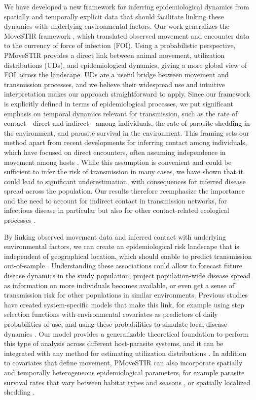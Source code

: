 \documentclass[letterpaper]{article}
\begin{document}
We have developed a new framework for inferring epidemiological dynamics from spatially and temporally explicit data that should facilitate linking these dynamics with underlying environmental factors. Our work generalizes the MoveSTIR framework \citep{Wilber2022}, which translated observed movement and encounter data to the currency of force of infection (FOI). Using a probabilistic perspective, PMoveSTIR provides a direct link between animal movement, utilization distributions (UDs), and epidemiological dynamics, giving a more global view of FOI across the landscape. UDs are a useful bridge between movement and transmission processes, and we believe their widespread use and intuitive interpretation makes our approach straightforward to apply.
Since our framework is explicitly defined in terms of epidemiological processes, we put significant emphasis on temporal dynamics relevant for transmission, such as the rate of contact---direct and indirect---among individuals, the rate of parasite shedding in the environment, and parasite survival in the environment. 
This framing sets our method apart from recent developments for inferring contact among individuals, which have focused on direct encounters, often assuming independence in movement among hosts \citep{Noonan2021,Das2023}. While this assumption is convenient and could be sufficient to infer the risk of transmission in many cases, we have shown that it could lead to significant underestimation, with consequences for inferred disease spread across the population. Our results therefore reemphasize the importance and the need to account for indirect contact in transmission networks, for infectious disease in particular but also for other contact-related ecological processes \citep{Wilber2022,Yang2023,Richardson2015}.

By linking observed movement data and inferred contact with underlying environmental factors, we can create an epidemiological risk landscape that is independent of geographical location, which should enable to predict transmission out-of-sample \citep{Manlove2022}. Understanding these associations could allow to forecast future disease dynamics in the study population, project population-wide disease spread as information on more individuals becomes available, or even get a sense of transmission risk for other populations in similar environments. Previous studies have created system-specific models that make this link, for example using step selection functions with environmental covariates as predictors of daily probabilities of use, and using these probabilities to simulate local disease dynamics \citep{Merkle2018}. Our model provides a generalizable theoretical foundation to perform this type of analysis across different host-parasite systems, and it can be integrated with any method for estimating utilization distributions \citep{Merkle2018,Michelot2020,Potts2023,Signer2017}. In addition to covariates that define movement, PMoveSTIR can also incorporate spatially and temporally heterogeneous epidemiological parameters, for example parasite survival rates that vary between habitat types and seasons \citep{Daversa2017}, or spatially localized shedding \citep{Weinstein2017}. 
\end{document}
